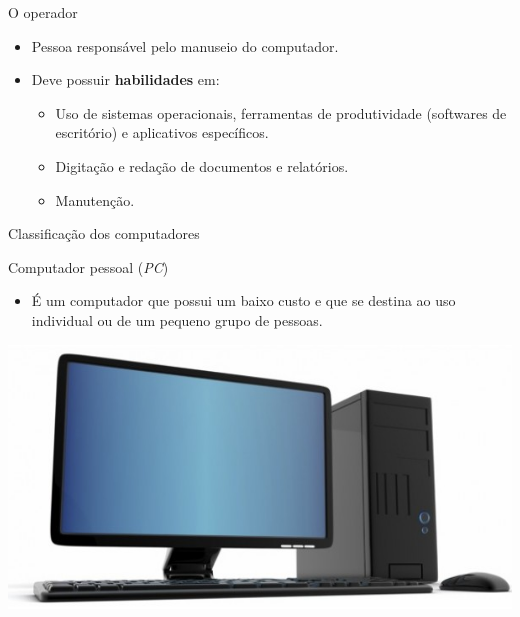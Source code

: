 \begin{frame}{O operador}
	\begin{block}{}
		\begin{itemize}
			\item Pessoa responsável pelo manuseio do computador.
			\item Deve possuir \textbf{habilidades} em:
			      \begin{itemize}
				      \item\normalsize Uso de sistemas operacionais, ferramentas de produtividade (softwares de escritório) e aplicativos específicos.
				      \item\normalsize Digitação e redação de documentos e relatórios.
				      \item\normalsize Manutenção.
			      \end{itemize}

		\end{itemize}
	\end{block}
\end{frame}


\begin{frame}{Classificação dos computadores}
	\begin{block}{Computador pessoal (\textit{PC})}
		\begin{itemize}
			\item É um computador que possui um baixo custo e que se destina ao uso individual ou de um pequeno grupo de pessoas.
		\end{itemize}
	\end{block}

	\centering
	\includegraphics[width=0.8\linewidth]{Figuras/Ch01/fig2.1}
\end{frame}


